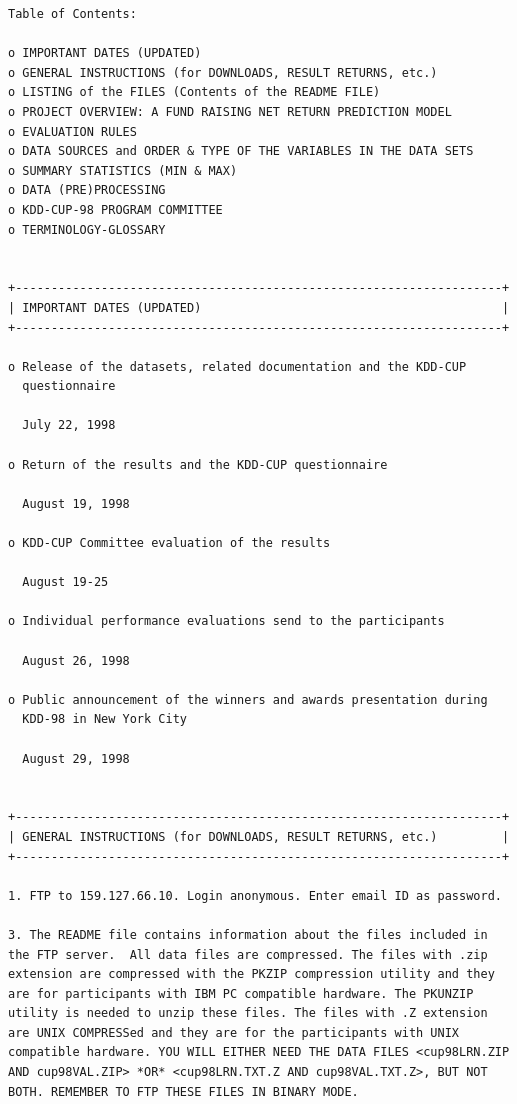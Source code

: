 \documentclass[
  11pt,
  a4paper,
  DIV=12,captions=tableheading,oneside,titlepage]{scrbook}
\begin{document}
\begin{verbatim}
Table of Contents:       

o IMPORTANT DATES (UPDATED)
o GENERAL INSTRUCTIONS (for DOWNLOADS, RESULT RETURNS, etc.)
o LISTING of the FILES (Contents of the README FILE)
o PROJECT OVERVIEW: A FUND RAISING NET RETURN PREDICTION MODEL
o EVALUATION RULES 
o DATA SOURCES and ORDER & TYPE OF THE VARIABLES IN THE DATA SETS 
o SUMMARY STATISTICS (MIN & MAX)
o DATA (PRE)PROCESSING
o KDD-CUP-98 PROGRAM COMMITTEE
o TERMINOLOGY-GLOSSARY


+--------------------------------------------------------------------+
| IMPORTANT DATES (UPDATED)                                          |
+--------------------------------------------------------------------+

o Release of the datasets, related documentation and the KDD-CUP
  questionnaire

  July 22, 1998

o Return of the results and the KDD-CUP questionnaire  

  August 19, 1998

o KDD-CUP Committee evaluation of the results

  August 19-25

o Individual performance evaluations send to the participants

  August 26, 1998
 
o Public announcement of the winners and awards presentation during
  KDD-98 in New York City

  August 29, 1998 


+--------------------------------------------------------------------+
| GENERAL INSTRUCTIONS (for DOWNLOADS, RESULT RETURNS, etc.)         | 
+--------------------------------------------------------------------+

1. FTP to 159.127.66.10. Login anonymous. Enter email ID as password.

3. The README file contains information about the files included in
the FTP server.  All data files are compressed. The files with .zip
extension are compressed with the PKZIP compression utility and they
are for participants with IBM PC compatible hardware. The PKUNZIP
utility is needed to unzip these files. The files with .Z extension
are UNIX COMPRESSed and they are for the participants with UNIX
compatible hardware. YOU WILL EITHER NEED THE DATA FILES <cup98LRN.ZIP
AND cup98VAL.ZIP> *OR* <cup98LRN.TXT.Z AND cup98VAL.TXT.Z>, BUT NOT
BOTH. REMEMBER TO FTP THESE FILES IN BINARY MODE.


\end{verbatim}
\end{document}
